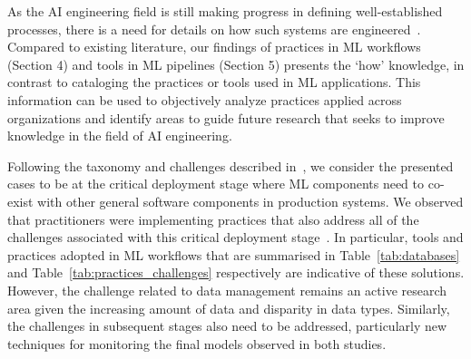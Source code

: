 




As the AI engineering field is still making progress in defining well-established processes, there is a need for details on how such systems are engineered~\cite{9121629}. Compared to existing literature, our findings of practices in ML workflows (Section 4) and tools in ML pipelines (Section 5) presents the ‘how’ knowledge, in contrast to cataloging the practices or tools used in ML applications. This information can be used to objectively analyze practices applied across organizations and identify areas to guide future research that seeks to improve knowledge in the field of AI engineering.

Following the taxonomy and challenges described in~\cite{Lwakatare2019}, we consider the presented cases to be at the critical deployment stage where ML components need to co-exist with other general software components in production systems. We observed that practitioners were implementing practices that also address all of the challenges associated with this critical deployment stage~\cite{Lwakatare2019}. In particular, tools and practices adopted in ML workflows that are summarised in Table~\ref{tab:databases} and Table~\ref{tab:practices_challenges} respectively are indicative of these solutions. However, the challenge related to data management remains an active research area given the increasing amount of data and disparity in data types. Similarly, the challenges in subsequent stages also need to be addressed, particularly new techniques for monitoring the final models observed in both studies.

